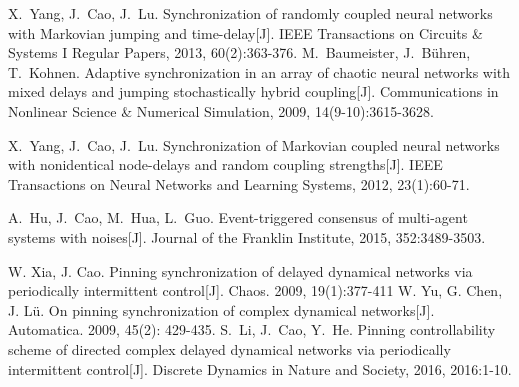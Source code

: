 \begin{thebibliography}{99}
X.~Yang, J.~Cao, J.~Lu.
 Synchronization of randomly coupled neural networks with {M}arkovian jumping and time-delay[J].
 IEEE Transactions on Circuits \& Systems I Regular Papers, 2013, 60(2):363-376.
M.~Baumeister, J.~Bühren, T.~Kohnen.
 Adaptive synchronization in an array of chaotic neural networks with mixed delays and jumping stochastically hybrid coupling[J].
 Communications in Nonlinear Science \& Numerical Simulation, 2009,
  14(9-10):3615-3628.

X.~Yang, J.~Cao, J.~Lu.
 Synchronization of {M}arkovian coupled neural networks with nonidentical node-delays and random coupling strengths[J].
 IEEE Transactions on Neural Networks and Learning Systems, 2012, 23(1):60-71.

A.~Hu, J.~Cao, M.~Hua, L.~Guo.
 Event-triggered consensus of multi-agent systems with noises[J].
Journal of the Franklin Institute, 2015, 352:3489-3503.






{ W. Xia, J. Cao. Pinning synchronization of delayed dynamical networks via periodically intermittent control[J]. Chaos. 2009, 19(1):377-411}
{W. Yu, G. Chen, J. Lü. On pinning synchronization of complex dynamical networks[J]. Automatica. 2009, 45(2): 429-435.}
S.~Li, J.~Cao, Y.~He. Pinning controllability scheme of directed complex delayed dynamical networks via periodically intermittent control[J]. Discrete Dynamics in Nature and Society, 2016, 2016:1-10.


\end{thebibliography}
